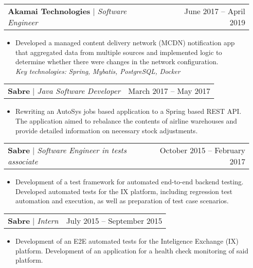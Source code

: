 \documentclass[letterpaper,11pt]{article}
\makeatletter
\newcommand{\resumeProjectHeading}[2]{
    \item
    \begin{tabular*}{0.97\textwidth}{l@{\extracolsep{\fill}}r}
      \small#1 & #2 \\
    \end{tabular*}\vspace{-7pt}
}
\makeatother
\begin{document}
          \resumeProjectHeading
          {\textbf{Akamai Technologies} $|$ \footnotesize\emph{Software Engineer}\vspace{8pt}}{June 2017 -- April 2019}
          {\small{
            \begin{itemize}
                \item \justifying Developed a managed content delivery network (MCDN) notification app that aggregated data from multiple sources and implemented logic to determine whether there were changes in the network configuration. \\
                \textit{Key technologies: Spring, Mybatis, PostgreSQL, Docker }
            \end{itemize}
            }

          \resumeProjectHeading
          {\textbf{Sabre} $|$ \footnotesize\emph{Java Software Developer}\vspace{8pt}}{March 2017 -- May 2017}
          {\small{
          \begin{itemize}
              \item \justifying Rewriting an AutoSys jobs based application to a Spring based REST API. The application aimed to rebalance the contents of airline warehouses and provide detailed information on necessary stock adjustments.
          \end{itemize} 
}}

          \resumeProjectHeading
          {\textbf{Sabre} $|$ \footnotesize\emph{Software Engineer in tests associate}\vspace{8pt}}{October 2015 -- February 2017}
          {\small{
          \begin{itemize}
              \item \justifying Development of a test framework for automated end-to-end backend testing. Developed automated tests for the IX platform, including regression test automation and execution, as well as preparation of test case scenarios.
          \end{itemize}

}}

          \resumeProjectHeading
          {\textbf{Sabre} $|$ \footnotesize\emph{Intern}\vspace{8pt}}{July 2015 -- September 2015}
          {\small{
          \begin{itemize}
              \item \justifying Development of an E2E automated tests for the
Inteligence Exchange (IX) platform. Development of an application for a health check monitoring of said platform.
          \end{itemize}
}}

}
\end{document}

